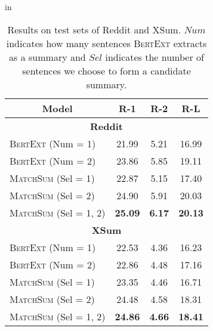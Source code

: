 \renewcommand\arraystretch{1.2}
\begin{table}[t]
\center \footnotesize
{} in
\begin{tabular}{lccc}
\toprule
\multicolumn{1}{c}{\textbf{Model}} & \textbf{R-1} & \textbf{R-2} & \textbf{R-L} \\
\midrule
\multicolumn{4}{c}{\textbf{Reddit}} \\
\midrule
\textsc{BertExt} (Num = 1) & 21.99 & 5.21	& 16.99 \\
\textsc{BertExt} (Num = 2) & 23.86 & 5.85	& 19.11 \\
\textsc{MatchSum} (Sel = 1) & 22.87 & 5.15 & 17.40 \\
\textsc{MatchSum} (Sel = 2) & 24.90 & 5.91 & 20.03 \\
\textsc{MatchSum} (Sel = 1, 2) & \textbf{25.09} & \textbf{6.17} & \textbf{20.13} \\

\midrule
\multicolumn{4}{c}{\textbf{XSum}} \\
\midrule
\textsc{BertExt} (Num = 1) & 22.53 & 4.36 & 16.23 \\
\textsc{BertExt} (Num = 2) & 22.86 & 4.48 & 17.16 \\
\textsc{MatchSum} (Sel = 1) & 23.35 & 4.46 & 16.71 \\
\textsc{MatchSum} (Sel = 2) & 24.48	& 4.58 & 18.31 \\
\textsc{MatchSum} (Sel = 1, 2) & \textbf{24.86} & \textbf{4.66} & \textbf{18.41} \\

\bottomrule
\end{tabular}
\caption{Results on test sets of Reddit and XSum. $Num$ indicates how many sentences \textsc{BertExt} extracts as a summary and $Sel$ indicates the number of sentences we choose to form a candidate summary.} \label{tab:abstractive datasets}
\end{table}


